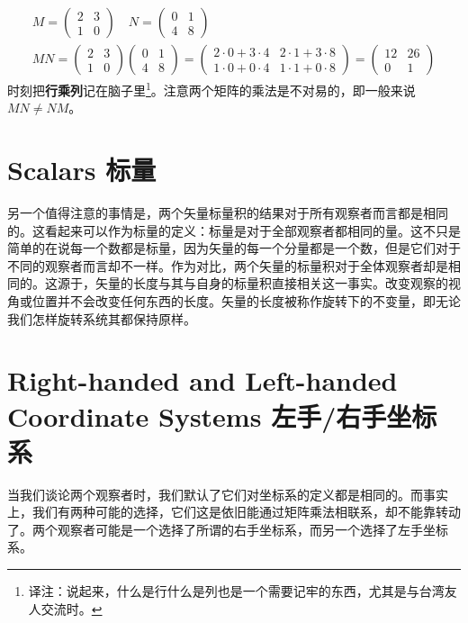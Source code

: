 \begin{equation}
\begin{aligned}
M= \begin{pmatrix}
2 & 3 \\ 1 & 0
\end{pmatrix} \quad N =
\begin{pmatrix}
0 & 1 \\ 4 & 8
\end{pmatrix} \\
MN = \begin{pmatrix}
2 & 3 \\ 1 & 0
\end{pmatrix}
\begin{pmatrix}
0 & 1 \\ 4 & 8
\end{pmatrix} =
\begin{pmatrix}
2\cdot 0+3\cdot 4 & 2\cdot 1+3\cdot 8 \\ 1\cdot 0+0\cdot 4 & 1\cdot 1+0\cdot 8
\end{pmatrix} =
\begin{pmatrix}
12 & 26 \\ 0 & 1
\end{pmatrix}
\end{aligned}
\end{equation}
时刻把{\bf 行乘列}记在脑子里\footnote{译注：说起来，什么是行什么是列也是一个需要记牢的东西，尤其是与台湾友人交流时。}。注意两个矩阵的乘法是不对易的，即一般来说$MN\ne NM$。

\section[标量]{Scalars 标量}\label{appendix.A.4}
另一个值得注意的事情是，两个矢量标量积的结果对于所有观察者而言都是相同的。这看起来可以作为标量的定义：标量是对于全部观察者都相同的量。这不只是简单的在说每一个数都是标量，因为矢量的每一个分量都是一个数，但是它们对于不同的观察者而言却不一样。作为对比，两个矢量的标量积对于全体观察者却是相同的。这源于，矢量的长度与其与自身的标量积直接相关这一事实。改变观察的视角或位置并不会改变任何东西的长度。矢量的长度被称作旋转下的不变量，即无论我们怎样旋转系统其都保持原样。

\section[左手/右手坐标系]{Right-handed and Left-handed Coordinate Systems 左手/右手坐标系}\label{appendix.A.5}
当我们谈论两个观察者时，我们默认了它们对坐标系的定义都是相同的。而事实上，我们有两种可能的选择，它们这是依旧能通过矩阵乘法相联系，却不能靠转动了。两个观察者可能是一个选择了所谓的右手坐标系，而另一个选择了左手坐标系。

